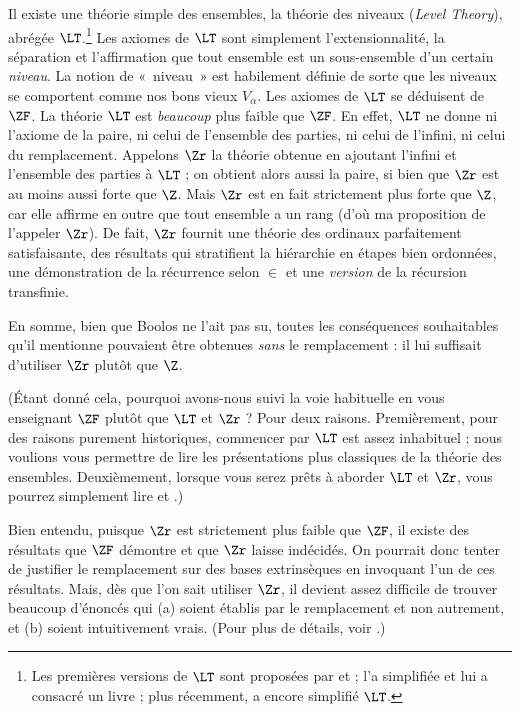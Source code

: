 \documentclass[../../../include/open-logic-section]{subfiles}
\begin{document}
Il existe une théorie simple des ensembles, la théorie des niveaux
(\emph{Level Theory}), abrégée $\LT$.\footnote{Les premières versions
de $\LT$ sont proposées par \citet{Montague1965} et \citet{Scott1974} ;
\citet{Potter2004} l'a simplifiée et lui a consacré un livre ; plus
récemment, \citet{ButtonLT1} a encore simplifié $\LT$.}
Les axiomes de $\LT$ sont simplement l'extensionnalité, la séparation
et l'affirmation que tout ensemble est un sous-ensemble d'un certain
\emph{niveau}. La notion de «~niveau~» est habilement définie de
sorte que les niveaux se comportent comme nos bons vieux $V_\alpha$.
Les axiomes de $\LT$ se déduisent de $\ZF$. La théorie $\LT$ est
\emph{beaucoup} plus faible que $\ZF$. En effet, $\LT$ ne donne ni
l'axiome de la paire, ni celui
de l'ensemble des parties, ni celui de l'infini, ni celui du
remplacement. Appelons $\Zr$ la théorie obtenue en ajoutant l'infini
et l'ensemble des parties à $\LT$ ; on obtient alors aussi la paire,
si bien que $\Zr$ est au moins aussi forte que $\Z$. Mais $\Zr$ est en
fait strictement plus forte que $\Z$, car elle affirme en outre que
tout ensemble a un rang (d'où ma proposition de l'appeler $\Zr$).
De fait, $\Zr$ fournit une théorie des ordinaux parfaitement
satisfaisante, des résultats qui stratifient la hiérarchie en étapes
bien ordonnées, une démonstration de la récurrence selon $\in$ et
une \emph{version} de la récursion transfinie.

En somme, bien que Boolos ne l'ait pas su, toutes les conséquences
souhaitables qu'il mentionne pouvaient être obtenues \emph{sans}
le remplacement : il lui suffisait d'utiliser $\Zr$ plutôt que $\Z$.

(Étant donné cela, pourquoi avons-nous suivi la voie habituelle en
vous enseignant $\ZF$ plutôt que $\LT$ et $\Zr$ ? Pour deux raisons.
Premièrement, pour des raisons purement historiques, commencer par
$\LT$ est assez inhabituel ; nous voulions vous permettre de lire les
présentations plus classiques de la théorie des ensembles.
Deuxièmement, lorsque vous serez prêts à aborder $\LT$ et $\Zr$,
vous pourrez simplement lire \citealt{Potter2004} et
\citealt{ButtonLT1}.)

Bien entendu, puisque $\Zr$ est strictement plus faible que $\ZF$,
il existe des résultats que $\ZF$ démontre et que $\Zr$ laisse
indécidés. On pourrait donc tenter de justifier le remplacement
sur des bases extrinsèques en invoquant l'un de ces résultats.
Mais, dès que l'on sait utiliser $\Zr$, il devient assez difficile
de trouver beaucoup d'énoncés qui (a) soient établis par le
remplacement et non autrement, et (b) soient intuitivement vrais.
(Pour plus de détails, voir \citealt[\S13.2]{Potter2004}.)
\end{document}
